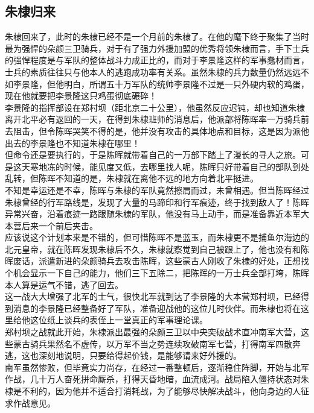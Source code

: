 \begin{multicols}{\theparacolNo}
\subsection{朱棣归来}
朱棣回来了，此时的朱棣已经不是一个月前的朱棣了。在他的麾下终于聚集了当时最为强悍的朵颜三卫骑兵，对于有了强力外援加盟的优秀将领朱棣而言，手下士兵的强悍程度是与军队的整体战斗力成正比的，而对于李景隆这样的军事蠢材而言，士兵的素质往往只与他本人的逃跑成功率有关系。虽然朱棣的兵力数量仍然远远不如李景隆，但他明白，所谓五十万军队的统帅李景隆不过是一只外硬内软的鸡蛋，现在他就要把李景隆这只鸡蛋彻底碾碎！\\

李景隆的指挥部设在郑村坝（距北京二十公里），他虽然反应迟钝，却也知道朱棣离开北平必有返回的一天，在得到朱棣班师的消息后，他派部将陈晖率一万骑兵前去阻击，但令陈晖哭笑不得的是，他并没有攻击的具体地点和目标，这是因为派他出去的李景隆也不知道朱棣在哪里！\\

但命令还是要执行的，于是陈晖就带着自己的一万部下踏上了漫长的寻人之旅。可是这天寒地冻的时候，能见度又低，去哪里找人呢，陈晖只好带着自己的部队到处乱转，但陈晖不知道的是，朱棣就在离他不远的地方向着北平挺进。\\

不知是幸运还是不幸，陈晖与朱棣的军队竟然擦肩而过，未曾相遇。但当陈晖经过朱棣曾经的行军路线是，发现了大量的马蹄印和行军痕迹，终于找到敌人了！陈晖异常兴奋，沿着痕迹一路跟随朱棣的军队，他没有马上动手，而是准备靠近本军大本营后来一个前后夹击。\\

应该说这个计划本来是不错的，但可惜陈晖不是蓝玉，而朱棣更不是捕鱼尔海边的北元皇帝，就在陈晖发现朱棣后不久，朱棣就察觉到自己被跟上了，他也没有和陈晖废话，派遣新进的朵颜骑兵去攻击陈晖，这些蒙古人刚收了朱棣的好处，正想找个机会显示一下自己的能力，他们三下五除二，把陈晖的一万士兵全部打垮，陈晖本人算是运气不错，逃了回去。\\

这一战大大增强了北军的士气，很快北军就到达了李景隆的大本营郑村坝，已经得到消息的李景隆已经整备好了军队，准备迎战他的这位儿时伙伴。而朱棣也将在这里给他这位纸上谈兵的表侄上一堂真正的军事理论课。\\

郑村坝之战就此开始，朱棣派出最强的朵颜三卫以中央突破战术直冲南军大营，这些蒙古骑兵果然名不虚传，以万军不当之势连续攻破南军七营，打得南军四散奔逃，这也深刻地说明，只要给得起价钱，是能够请来好外援的。\\

南军虽然惨败，但毕竟实力尚存，在经过一番整顿后，逐渐稳住阵脚，开始与北军作战，几十万人奋死拼命厮杀，打得天昏地暗，血流成河。战局陷入僵持状态对朱棣是不利的，因为他并不适合打消耗战，为了能够尽快解决战斗，他向身边的人征求作战意见。\\


\end{multicols}

